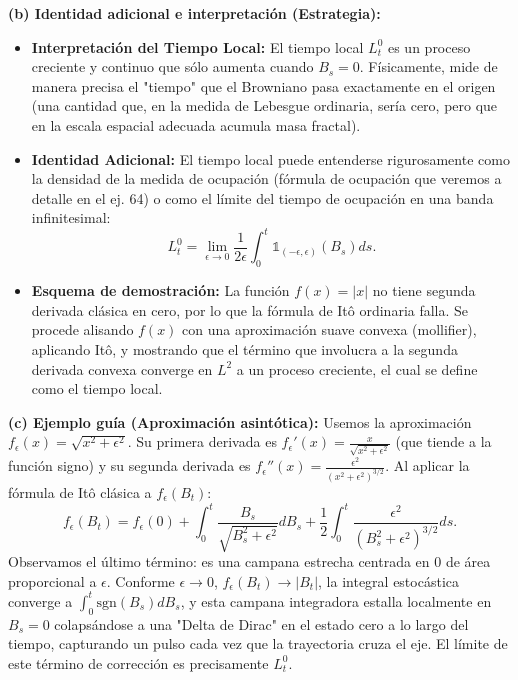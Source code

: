\documentclass[11pt, letterpaper]{article}
\begin{document}
\begin{solucion}
    \textbf{(b) Identidad adicional e interpretación (Estrategia):}
    \begin{itemize}
        \item[(i)] \textbf{Interpretación del Tiempo Local:} El tiempo local $L_t^0$ es un proceso creciente y continuo que sólo aumenta cuando $B_s = 0$. Físicamente, mide de manera precisa el "tiempo" que el Browniano pasa exactamente en el origen (una cantidad que, en la medida de Lebesgue ordinaria, sería cero, pero que en la escala espacial adecuada acumula masa fractal).
        \item[(ii)] \textbf{Identidad Adicional:} El tiempo local puede entenderse rigurosamente como la densidad de la medida de ocupación (fórmula de ocupación que veremos a detalle en el ej. 64) o como el límite del tiempo de ocupación en una banda infinitesimal:
        \[ L_t^0 = \lim_{\epsilon \to 0} \frac{1}{2\epsilon} \int_0^t \mathbb{1}_{(-\epsilon, \epsilon)}(B_s) ds. \]
        \item[(iii)] \textbf{Esquema de demostración:} La función $f(x) = |x|$ no tiene segunda derivada clásica en cero, por lo que la fórmula de Itô ordinaria falla. Se procede alisando $f(x)$ con una aproximación suave convexa (mollifier), aplicando Itô, y mostrando que el término que involucra a la segunda derivada convexa converge en $L^2$ a un proceso creciente, el cual se define como el tiempo local.
    \end{itemize}

    \vspace{3mm}
    \textbf{(c) Ejemplo guía (Aproximación asintótica):}
    Usemos la aproximación $f_\epsilon(x) = \sqrt{x^2 + \epsilon^2}$. Su primera derivada es $f_\epsilon'(x) = \frac{x}{\sqrt{x^2+\epsilon^2}}$ (que tiende a la función signo) y su segunda derivada es $f_\epsilon''(x) = \frac{\epsilon^2}{(x^2+\epsilon^2)^{3/2}}$.
    Al aplicar la fórmula de Itô clásica a $f_\epsilon(B_t)$:
    \[ f_\epsilon(B_t) = f_\epsilon(0) + \int_0^t \frac{B_s}{\sqrt{B_s^2+\epsilon^2}} dB_s + \frac{1}{2} \int_0^t \frac{\epsilon^2}{(B_s^2+\epsilon^2)^{3/2}} ds. \]
    Observamos el último término: es una campana estrecha centrada en $0$ de área proporcional a $\epsilon$. Conforme $\epsilon \to 0$, $f_\epsilon(B_t) \to |B_t|$, la integral estocástica converge a $\int_0^t \text{sgn}(B_s)dB_s$, y esta campana integradora estalla localmente en $B_s=0$ colapsándose a una "Delta de Dirac" en el estado cero a lo largo del tiempo, capturando un pulso cada vez que la trayectoria cruza el eje. El límite de este término de corrección es precisamente $L_t^0$.


\end{solucion}
\end{document}
